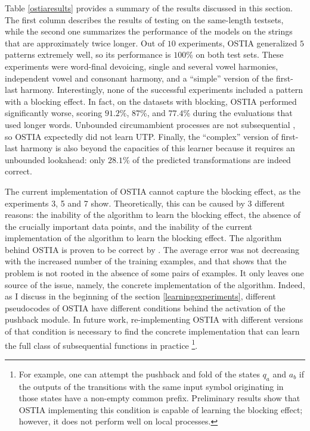 Table \ref{ostiaresults} provides a summary of the results discussed in this section.
The first column describes the results of testing on the same-length testsets, while the second one summarizes the performance of the models on the strings that are approximately twice longer.
Out of $10$ experiments, OSTIA generalized $5$ patterns extremely well, so its performance is $100$\% on both test sets.
These experiments were word-final devoicing, single and several vowel harmonies, independent vowel and consonant harmony, and a ``simple'' version of the first-last harmony.
Interestingly, none of the successful experiments included a pattern with a blocking effect. 
In fact, on the datasets with blocking, OSTIA performed significantly worse, scoring $91.2$\%, $87$\%, and $77.4$\% during the evaluations that used longer words.
Unbounded circumambient processes are not subsequential \citep{Jardine2016}, so OSTIA expectedly did not learn UTP.
Finally, the ``complex'' version of first-last harmony is also beyond the capacities of this learner because it requires an unbounded lookahead: only $28.1$\% of the predicted transformations are indeed correct.

The current implementation of OSTIA cannot capture the blocking effect, as the experiments 3, 5 and 7 show.
Theoretically, this can be caused by 3 different reasons: the inability of the algorithm to learn the blocking effect, the absence of the crucially important data points, and the inability of the current implementation of the algorithm to learn the blocking effect.
The algorithm behind OSTIA is proven to be correct by \cite{OncinaEtAl1993}.
The average error was not decreasing with the increased number of the training examples, and that shows that the problem is not rooted in the absence of some pairs of examples.
It only leaves one source of the issue, namely, the concrete implementation of the algorithm.
Indeed, as I discuss in the beginning of the section \ref{learningexperiments}, different pseudocodes of OSTIA have different conditions behind the activation of the pushback module.
In future work, re-implementing OSTIA with different versions of that condition is necessary to find the concrete implementation that can learn the full class of subsequential functions in practice%
\footnote{For example, one can attempt the pushback and fold of the states $q_a$ and $a_b$ if the outputs of the transitions with the same input symbol originating in those states have a non-empty common prefix.
Preliminary results show that OSTIA implementing this condition is capable of learning the blocking effect; however, it does not perform well on local processes.}.


